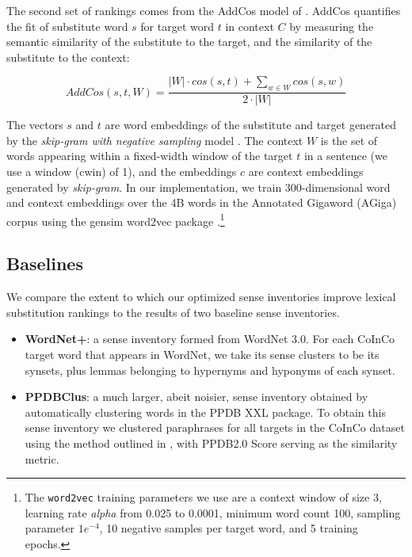 \documentclass[11pt]{article}
\begin{document}
The second set of rankings comes from the AddCos model of . AddCos quantifies the fit of substitute word $s$ for target word $t$ in context $C$ by measuring the semantic similarity of the substitute to the target, and the similarity of the substitute to the context:

\begin{dmath}
	AddCos(s,t,W) = \frac{|W| \cdot cos(s,t) + \sum_{w \in W} cos(s,w)}{2 \cdot |W|}
\end{dmath}
	
\noindent The vectors $s$ and $t$ are word embeddings of the substitute and target generated by the \textit{skip-gram with negative sampling} model \cite{mikolov2013distributed,mikolov2013efficient}. The context $W$ is the set of words appearing within a fixed-width window of the target $t$ in a sentence (we use a window (cwin) of 1), and the embeddings $c$ are context embeddings generated by \textit{skip-gram}. In our implementation, we train 300-dimensional word and context embeddings over the 4B words in the Annotated Gigaword (AGiga) corpus \cite{napoles2012annotated} using the gensim word2vec package \cite{mikolov2013distributed,mikolov2013efficient,ismu:884893}.\footnote{The \texttt{word2vec} training parameters we use are a context window of size 3, learning rate \textit{alpha} from 0.025 to 0.0001, minimum word count 100, sampling parameter $1e^{-4}$, 10 negative samples per target word, and 5 training epochs.}

\subsection{Baselines}

We compare the extent to which our optimized sense inventories improve lexical substitution rankings to the results of two baseline sense inventories.

\begin{itemize}
\item\textbf{WordNet+}: a sense inventory formed from WordNet 3.0. For each CoInCo target word that appears in WordNet, we take its sense clusters to be its synsets, plus lemmas belonging to hypernyms and hyponyms of each synset. 
\item\textbf{PPDBClus}: a much larger, abeit noisier, sense inventory obtained by automatically clustering words in the PPDB XXL package. To obtain this sense inventory we clustered paraphrases for all targets in the CoInCo dataset using the method outlined in , with PPDB2.0 Score serving as the similarity metric. 
\end{itemize}
\end{document}
